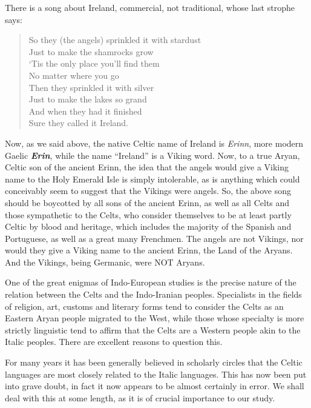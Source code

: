 There is a song about Ireland, commercial, not traditional, whose last strophe says:

\begin{verse}
So they (the angels) sprinkled it with stardust\\
Just to make the shamrocks grow\\
`Tis the only place you'll find them\\
No matter where you go\\
Then they sprinkled it with silver\\
Just to make the lakes so grand\\
And when they had it finished\\
Sure they called it Ireland.
\end{verse}

Now, as we said above, the native Celtic name of Ireland is \emph{Erinn}, more modern Gaelic \textbf{\emph{Erin}}, while the name ``Ireland'' is a Viking word. Now, to a true Aryan, Celtic son of the ancient Erinn, the idea that the angels would give a Viking name to the Holy Emerald Isle is simply intolerable, as is anything which could conceivably seem to suggest that the Vikings were angels. So, the above song should be boycotted by all sons of the ancient Erinn, as well as all Celts and those sympathetic to the Celts, who consider themselves to be at least partly Celtic by blood and heritage, which includes the majority of the Spanish and Portuguese, as well as a great many Frenchmen. The angels are not Vikings, nor would they give a Viking name to the ancient Erinn, the Land of the Aryans. And the Vikings, being Germanic, were NOT Aryans.

One of the great enigmas of Indo-European studies is the precise nature of the relation between the Celts and the Indo-Iranian peoples. Specialists in the fields of religion, art, customs and literary forms tend to consider the Celts as an Eastern Aryan people migrated to the West, while those whose specialty is more strictly linguistic tend to affirm that the Celts are a Western people akin to the Italic peoples. There are excellent reasons to question this.

For many years it has been generally believed in scholarly circles that the Celtic languages are most closely related to the Italic languages. This has now been put into grave doubt, in fact it now appears to be almost certainly in error. We shall deal with this at some length, as it is of crucial importance to our study.

